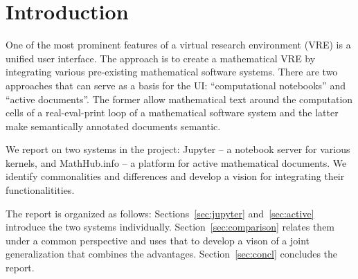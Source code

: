 \section{Introduction}\label{sec:intro}

One of the most prominent features of a virtual research environment (VRE) is a unified
user interface. The \pn approach is to create a mathematical VRE by integrating various
pre-existing mathematical software systems. There are two approaches that can serve as a
basis for the \pn UI: ``computational notebooks'' and ``active documents''. The former
allow mathematical text around the computation cells of a real-eval-print loop of a
mathematical software system and the latter make semantically annotated documents
semantic.
  
We report on two systems in the \pn project: Jupyter\cite{jupyter-project:on} -- a
notebook server for various kernels, and MathHub.info -- a platform for active
mathematical documents. We identify commonalities and differences and develop a vision for
integrating their functionalitities.
  
The report is organized as follows: Sections~\ref{sec:jupyter} and~\ref{sec:active}
introduce the two systems individually. Section~\ref{sec:comparison} relates them under a
common perspective and uses that to develop a vison of a joint generalization that
combines the advantages. Section~\ref{sec:concl} concludes the report.

